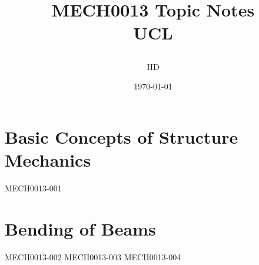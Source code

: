 \documentclass[12pt,a4paper, twoside]{report}
\begin{document}
\title{
  {MECH0013 Topic Notes}\\
  {\large UCL}
  \author{HD}
  \date{\today}
}
\maketitle
\tableofcontents
\chapter{Basic Concepts of Structure Mechanics}
{MECH0013-001}
\chapter{Bending of Beams}
{MECH0013-002}
{MECH0013-003}
{MECH0013-004}
\end{document}
